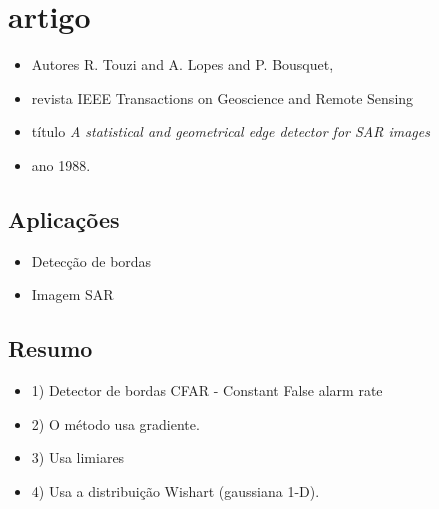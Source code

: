 \documentclass{article}
\begin{document}

\section{artigo \cite{tlb}}
\begin{itemize}
\item Autores R. Touzi and A. Lopes and P. Bousquet, 
\item revista IEEE Transactions on Geoscience and Remote Sensing
\item título \textit{A statistical and geometrical edge detector for {SAR} images}
\item ano 1988.
\end{itemize}
\subsection{Aplicações}
\begin{itemize}
\item Detecção de bordas
\item Imagem SAR
\end{itemize}
\subsection{Resumo}
\begin{itemize}
\item 1) Detector de bordas CFAR - Constant False alarm rate
\item 2) O método usa gradiente.
\item 3) Usa limiares
\item 4) Usa a distribuição  Wishart (gaussiana 1-D).
\end{itemize}
\end{document}
